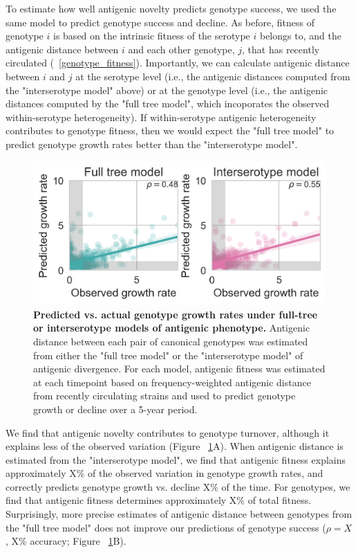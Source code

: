 \documentclass[11pt,oneside,letterpaper]{article}
\begin{document}
To estimate how well antigenic novelty predicts genotype success, we used the same model to predict genotype success and decline.
As before, fitness of genotype $i$ is based on the intrinsic fitness of the serotype $i$ belongs to, and the antigenic distance between $i$ and each other genotype, $j$, that has recently circulated (~\ref{genotype_fitness}).
Importantly, we can calculate antigenic distance between $i$ and $j$ at the serotype level (i.e., the antigenic distances computed from the "interserotype model" above) or at the genotype level (i.e., the antigenic distances computed by the "full tree model", which incoporates the observed within-serotype heterogeneity).
If within-serotype antigenic heterogeneity contributes to genotype fitness, then we would expect the "full tree model" to predict genotype growth rates better than the "interserotype model".

\begin{figure}[h]
\centering
\includegraphics[width=0.7\linewidth]{../figures/png/genotype_fitness_model_compare.png}
\begin{centering}
    \caption{\textbf{Predicted vs. actual genotype growth rates under full-tree or interserotype models of antigenic phenotype.} \linebreak Antigenic distance between each pair of canonical genotypes was estimated from either the "full tree model" or the "interserotype model" of antigenic divergence. For each model, antigenic fitness was estimated at each timepoint based on frequency-weighted antigenic distance from recently circulating strains and used to predict genotype growth or decline over a 5-year period.}
     \label{genotype_growth_rates}
\end{centering}
\end{figure}

We find that antigenic novelty contributes to genotype turnover, although it explains less of the observed variation (Figure ~\ref{genotype_growth_rates}A).
When antigenic distance is estimated from the "interserotype model", we find that antigenic fitness explains approximately X\% of the observed variation in genotype growth rates, and correctly predicts genotype growth vs. decline X\% of the time.
For genotypes, we find that antigenic fitness determines approximately X\% of total fitness.
Surprisingly, more precise estimates of antigenic distance between genotypes from the "full tree model" does not improve our predictions of genotype success ($\rho = X$, X\% accuracy; Figure ~\ref{genotype_growth_rates}B).
\end{document}
